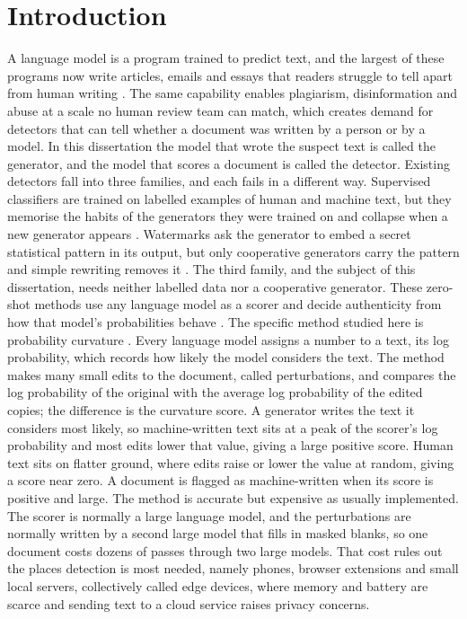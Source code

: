 \documentclass[logo,msc,cs]{infthesis}      %
\begin{document}
\chapter{Introduction}
\label{chap:introduction}
A language model is a program trained to predict text, and the largest of these programs now write articles, emails and essays that readers struggle to tell apart from human writing \citep{crothers2023machine}. The same capability enables plagiarism, disinformation and abuse at a scale no human review team can match, which creates demand for detectors that can tell whether a document was written by a person or by a model. In this dissertation the model that wrote the suspect text is called the generator, and the model that scores a document is called the detector.
Existing detectors fall into three families, and each fails in a different way. Supervised classifiers are trained on labelled examples of human and machine text, but they memorise the habits of the generators they were trained on and collapse when a new generator appears \citep{wu2025survey}. Watermarks ask the generator to embed a secret statistical pattern in its output, but only cooperative generators carry the pattern and simple rewriting removes it \citep{kirchenbauer2023watermark}. The third family, and the subject of this dissertation, needs neither labelled data nor a cooperative generator. These zero-shot methods use any language model as a scorer and decide authenticity from how that model's probabilities behave \citep{mitchell2023detectgpt}.
The specific method studied here is probability curvature \citep{mitchell2023detectgpt}. Every language model assigns a number to a text, its log probability, which records how likely the model considers the text. The method makes many small edits to the document, called perturbations, and compares the log probability of the original with the average log probability of the edited copies; the difference is the curvature score. A generator writes the text it considers most likely, so machine-written text sits at a peak of the scorer's log probability and most edits lower that value, giving a large positive score. Human text sits on flatter ground, where edits raise or lower the value at random, giving a score near zero. A document is flagged as machine-written when its score is positive and large.
The method is accurate but expensive as usually implemented. The scorer is normally a large language model, and the perturbations are normally written by a second large model that fills in masked blanks, so one document costs dozens of passes through two large models. That cost rules out the places detection is most needed, namely phones, browser extensions and small local servers, collectively called edge devices, where memory and battery are scarce and sending text to a cloud service raises privacy concerns.
\end{document}
